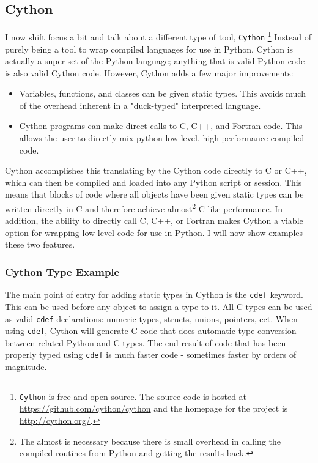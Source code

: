 \subsection{Cython} \label{sub:cython}

  I now shift focus a bit and talk about a different type of tool, \texttt{Cython} \footnote{\texttt{Cython} is free and open source. The source code is hosted at \url{https://github.com/cython/cython} and the homepage for the project is \url{http://cython.org/}. } Instead of purely being a tool to wrap compiled languages for use in Python, Cython is actually a super-set of the Python language; anything that is valid Python code is also valid Cython code. However, Cython adds a few major improvements:

  \begin{itemize}
    \item Variables, functions, and classes can be given static types. This avoids much of the overhead inherent in a "duck-typed" interpreted language.
    \item Cython programs can make direct calls to C, C++, and Fortran code. This allows the user to directly mix python low-level, high performance compiled code.
  \end{itemize}

  \mainstretch{}
  Cython accomplishes this translating by the Cython code directly to C or C++, which can then be compiled and loaded into any Python script or session. This means that blocks of code where all objects have been given static types can be written directly in C and therefore achieve almost\footnote{The almost is necessary because there is small overhead in calling the compiled routines from Python and getting the results back.} C-like performance. In addition, the ability to directly call C, C++, or Fortran makes Cython a viable option for wrapping low-level code for use in Python. I will now show examples these two features.

  \subsubsection{Cython Type Example} \label{ssub:cython_type_example}

    The main point of entry for adding static types in Cython is the \texttt{cdef} keyword. This can be used before any object to assign a type to it. All C types can be used as valid \texttt{cdef} declarations: numeric types, structs, unions, pointers, ect. When using \texttt{cdef}, Cython will generate C code that does automatic type conversion between related Python and C types. The end result of code that has been properly typed using \texttt{cdef} is much faster code - sometimes faster by orders of magnitude.

